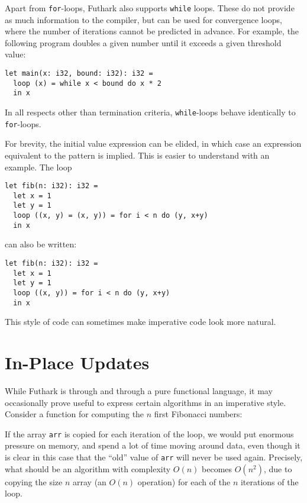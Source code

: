 \documentclass[oneside,11pt]{book}
\newenvironment{wrap}{\vspace{\topskip}\par\noindent\begin{minipage}{\linewidth}}{\end{minipage}\par}
\newcommand{\inplisting}[1]{\begin{wrap}\end{wrap}}
\begin{document}
Apart from \texttt{for}-loops, Futhark also supports \texttt{while}
loops.  These do not provide as much information to the compiler, but
can be used for convergence loops, where the number of iterations
cannot be predicted in advance.  For example, the following program
doubles a given number until it exceeds a given threshold value:

\begin{lstlisting}
let main(x: i32, bound: i32): i32 =
  loop (x) = while x < bound do x * 2
  in x
\end{lstlisting}

\noindent
In all respects other than termination criteria, \texttt{while}-loops
behave identically to \texttt{for}-loops.

For brevity, the initial value expression can be elided, in which case
an expression equivalent to the pattern is implied.  This is easier to
understand with an example.  The loop

\begin{lstlisting}
let fib(n: i32): i32 =
  let x = 1
  let y = 1
  loop ((x, y) = (x, y)) = for i < n do (y, x+y)
  in x
\end{lstlisting}

\noindent
can also be written:

\begin{lstlisting}
let fib(n: i32): i32 =
  let x = 1
  let y = 1
  loop ((x, y)) = for i < n do (y, x+y)
  in x
\end{lstlisting}

\noindent
This style of code can sometimes make imperative code look more natural.

\section{In-Place Updates}
\label{sec:in-place-updates}

While Futhark is through and through a pure functional language, it
may occasionally prove useful to express certain algorithms in an
imperative style.  Consider a function for computing the $n$ first
Fibonacci numbers:

\inplisting{src/fib_sequential.fut}

If the array \texttt{arr} is copied for each iteration of the loop, we
would put enormous pressure on memory, and spend a lot of time moving
around data, even though it is clear in this case that the ``old''
value of \texttt{arr} will never be used again.  Precisely, what
should be an algorithm with complexity $O(n)$ becomes $O(n^2)$, due to
copying the size $n$ array (an $O(n)$ operation) for each of the $n$
iterations of the loop.
\end{document}

